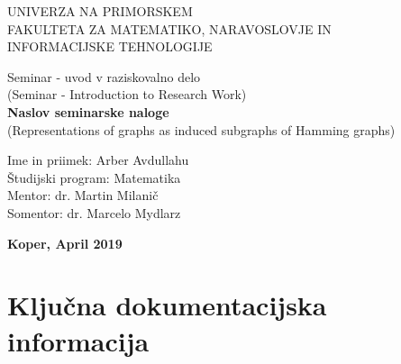 \documentclass[12pt,a4paper,titlepage,openany]{report}
\begin{document}
\pagestyle{empty}
\begin{center}
\noindent \large UNIVERZA NA PRIMORSKEM\\
\large FAKULTETA ZA MATEMATIKO, NARAVOSLOVJE IN\\
INFORMACIJSKE TEHNOLOGIJE


\normalsize
\vspace{5.5cm}
Seminar - uvod v raziskovalno delo\\
(Seminar - Introduction to Research Work)\\
\textbf{\large Naslov seminarske naloge}\\
\normalsize
(Representations of graphs as induced subgraphs of Hamming graphs)\\
\end{center}

\begin{flushleft}
\vspace{5cm}
\noindent Ime in priimek: Arber Avdullahu
\\
\noindent \v Studijski program: Matematika
\\
\noindent Mentor: dr. Martin Milani\v c
\\
\noindent Somentor: dr. Marcelo Mydlarz
\\
\end{flushleft}

\vspace{4cm}
\begin{center}
\large \textbf{Koper, April 2019}
\end{center}
\newpage

\pagestyle{fancy}

\section*{Klju\v cna dokumentacijska informacija}
\end{document}
